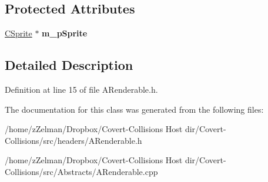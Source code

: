 \subsection*{Protected Attributes}
\begin{DoxyCompactItemize}
\item 
\hypertarget{classARenderable_a6030df923c81b400e94ff1f6a9df41f8}{\hyperlink{classCSprite}{C\-Sprite} $\ast$ {\bfseries m\-\_\-p\-Sprite}}\label{classARenderable_a6030df923c81b400e94ff1f6a9df41f8}

\end{DoxyCompactItemize}


\subsection{Detailed Description}


Definition at line 15 of file A\-Renderable.\-h.



The documentation for this class was generated from the following files\-:\begin{DoxyCompactItemize}
\item 
/home/z\-Zelman/\-Dropbox/\-Covert-\/\-Collisions Host dir/\-Covert-\/\-Collisions/src/headers/A\-Renderable.\-h\item 
/home/z\-Zelman/\-Dropbox/\-Covert-\/\-Collisions Host dir/\-Covert-\/\-Collisions/src/\-Abstracts/A\-Renderable.\-cpp\end{DoxyCompactItemize}
